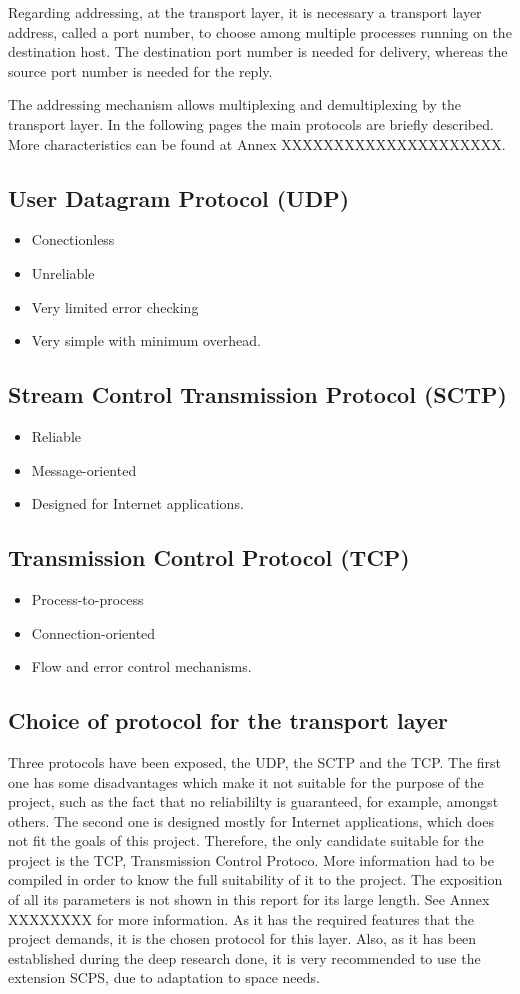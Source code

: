 Regarding addressing, at the transport layer, it is necessary a transport layer address, called a port number, to choose among multiple processes running on the destination host. The destination port number is needed for delivery, whereas the source port number is needed for the reply. 

The addressing mechanism allows multiplexing and demultiplexing by the transport layer. In the following pages the main protocols are briefly described. More characteristics can be found at Annex XXXXXXXXXXXXXXXXXXXXX.
\subsection{User Datagram Protocol (UDP)}
\begin{itemize}
\item Conectionless
\item Unreliable
\item Very limited error checking
\item Very simple with minimum overhead.
\end{itemize}
\subsection{Stream Control Transmission Protocol (SCTP)}
\begin{itemize}
\item Reliable
\item Message-oriented
\item Designed for Internet applications.
\end{itemize}
\subsection{ Transmission Control Protocol (TCP)}
\begin{itemize}
\item Process-to-process 
\item Connection-oriented
\item Flow and error control mechanisms.
\end{itemize}
\subsection{Choice of protocol for the transport layer}
Three protocols have been exposed, the UDP, the SCTP and the TCP. The first one has some disadvantages which make it not suitable for the purpose of the project, such as the fact that no reliabililty is guaranteed, for example, amongst others. The second one is designed mostly for Internet applications, which does not fit the goals of this project. Therefore, the only candidate suitable for the project is the TCP, Transmission Control Protoco. More information had to be compiled in order to know the full suitability of it to the project. The exposition of all its parameters is not shown in this report for its large length. See Annex XXXXXXXX for more information.  As it has the required features that the project demands, it is the chosen protocol for this layer. Also, as it has been established during the deep research done, it is very recommended to use the extension SCPS, due to adaptation to space needs.  

%
